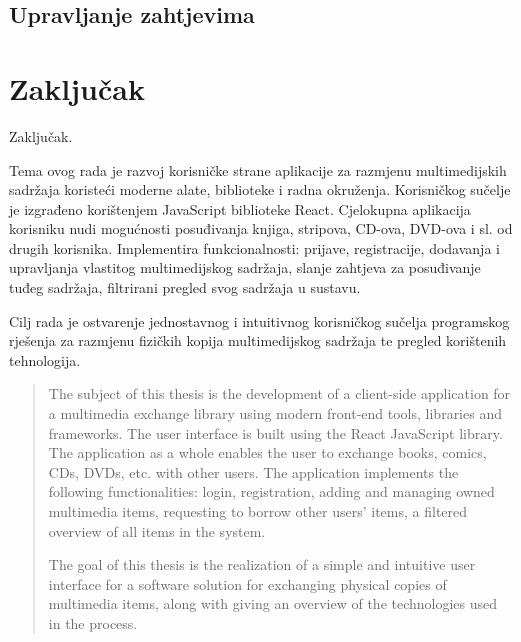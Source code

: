 \documentclass[times, utf8, zavrsni, numeric]{fer}
\newcommand{\razmaks}{\vspace{10pt}}
\begin{document}
\razmaks

\newpage


\section{Upravljanje zahtjevima}



\chapter{Zaključak}
Zaključak.






\begin{sazetak}
Tema ovog rada je razvoj korisničke strane aplikacije za razmjenu multimedijskih sadržaja koristeći moderne alate, biblioteke i radna okruženja.
Korisničkog sučelje je izgrađeno korištenjem JavaScript biblioteke React.
Cjelokupna aplikacija korisniku nudi mogućnosti posuđivanja knjiga, stripova, CD-ova, DVD-ova i sl. od drugih korisnika.
Implementira funkcionalnosti: prijave, registracije, dodavanja i upravljanja vlastitog multimedijskog sadržaja, slanje zahtjeva za posuđivanje tuđeg sadržaja, filtrirani pregled svog sadržaja u sustavu.

Cilj rada je ostvarenje jednostavnog i intuitivnog korisničkog sučelja programskog rješenja za razmjenu fizičkih kopija multimedijskog sadržaja te pregled korištenih tehnologija.

\end{sazetak}

\begin{abstract}
The subject of this thesis is the development of a client-side application for a multimedia exchange library using modern front-end tools, libraries and frameworks.
The user interface is built using the React JavaScript library.
The application as a whole enables the user to exchange books, comics, CDs, DVDs, etc. with other users.
The application implements the following functionalities: login, registration, adding and managing owned multimedia items, requesting to borrow other users' items, a filtered overview of all items in the system. 

The goal of this thesis is the realization of a simple and intuitive user interface for a software solution for exchanging physical copies of multimedia items, along with giving an overview of the technologies used in the process.

\end{abstract}
\end{document}
